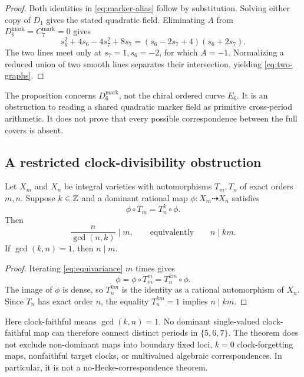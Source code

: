 \begin{proof}
Both identities in \eqref{eq:marker-alias} follow by substitution.  Solving
either copy of $D_1$ gives the stated quadratic field.  Eliminating $A$ from
$D_6^{\mathrm{mark}}=C_7^{\mathrm{mark}}=0$ gives
\[
 s_6^2+4s_6-4s_7^2+8s_7
 =(s_6-2s_7+4)(s_6+2s_7).
\]
The two lines meet only at $s_7=1,s_6=-2$, for which $A=-1$.  Normalizing a
reduced union of two smooth lines separates their intersection, yielding
\eqref{eq:two-graphs}.
\end{proof}

The proposition concerns $D_6^{\mathrm{mark}}$, not the chiral ordered
curve $E_6$.  It is an obstruction to reading a shared quadratic marker
field as primitive cross-period arithmetic.  It does not prove that every
possible correspondence between the full covers is absent.

\subsection{A restricted clock-divisibility obstruction}

\begin{theorem}\label{thm:divisibility}
Let $X_m$ and $X_n$ be integral varieties with automorphisms $T_m,T_n$ of
exact orders $m,n$.  Suppose $k\in\mathbb Z$ and a dominant rational map
$\phi:X_m\dashrightarrow X_n$ satisfies
\begin{equation}\label{eq:equivariance}
 \phi\circ T_m=T_n^k\circ\phi.
\end{equation}
Then
\begin{equation}\label{eq:divisibility}
 \frac{n}{\gcd(n,k)}\mid m,
 \qquad\text{equivalently}\qquad n\mid km.
\end{equation}
If $\gcd(k,n)=1$, then $n\mid m$.
\end{theorem}

\begin{proof}
Iterating \eqref{eq:equivariance} $m$ times gives
\[
 \phi=\phi\circ T_m^m=T_n^{km}\circ\phi.
\]
The image of $\phi$ is dense, so $T_n^{km}$ is the identity as a rational
automorphism of $X_n$.  Since $T_n$ has exact order $n$, the equality
$T_n^{km}=1$ implies $n\mid km$.
\end{proof}

Here clock-faithful means $\gcd(k,n)=1$.  No dominant single-valued
clock-faithful map can therefore connect distinct periods in $\{5,6,7\}$.
The theorem does not exclude non-dominant maps into
boundary fixed loci, $k=0$ clock-forgetting maps, nonfaithful target clocks,
or multivalued algebraic correspondences.  In particular, it is not a
no-Hecke-correspondence theorem.
